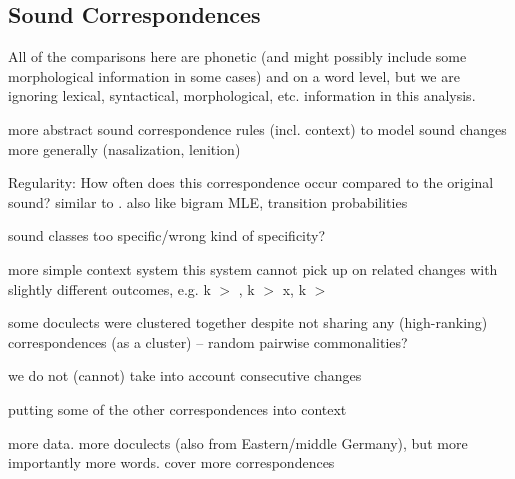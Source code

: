 \documentclass[a4paper]{article}
\begin{document}
\subsection{Sound Correspondences}

All of the comparisons here are phonetic (and might possibly include some morphological information in some cases) and on a word level, but we are ignoring lexical, syntactical, morphological, etc. information in this analysis.

more abstract sound correspondence rules (incl. context) to model sound changes more generally (nasalization, lenition)

Regularity: How often does this correspondence occur compared to the original sound? similar to \citet{prokic2007identifying, prokic2013combining}. also like bigram MLE, transition probabilities

sound classes too specific/wrong kind of specificity?

more simple context system
this system cannot pick up on related changes with slightly different outcomes,
e.g. k $>$ , k $>$ x, k $>$ \textchi

some doculects were clustered together despite not sharing any (high-ranking) correspondences (as a cluster) -- random pairwise commonalities?

we do not (cannot) take into account consecutive changes

putting some of the other correspondences into context

more data. more doculects (also from Eastern/middle Germany), but more importantly more words. cover more correspondences



\end{document}
